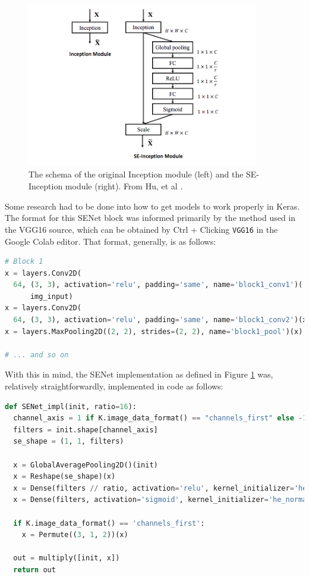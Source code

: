 \documentclass{article}
\begin{document}
\begin{figure}[H]
    \centering
    \includegraphics[width=4in]{csci-8110/hw-3/images/SENet_diagram.png}
    \caption{The schema of the original Inception module (left) and the SE-Inception module (right). From Hu, et al \cite{Hu2020Squeeze-and-ExcitationNetworks}.}
    \label{fig:diagram}
\end{figure}

\par Some research had to be done into how to get models to work properly in Keras. 
The format for this SENet block was informed primarily by the method used in the VGG16 source, which can be obtained by Ctrl + Clicking \lstinline{VGG16} in the Google Colab editor.
That format, generally, is as follows:

\begin{lstlisting}[language=Python]
# Block 1
x = layers.Conv2D(
  64, (3, 3), activation='relu', padding='same', name='block1_conv1')(
      img_input)
x = layers.Conv2D(
  64, (3, 3), activation='relu', padding='same', name='block1_conv2')(x)
x = layers.MaxPooling2D((2, 2), strides=(2, 2), name='block1_pool')(x)

# ... and so on
\end{lstlisting}

\par With this in mind, the SENet implementation as defined in Figure \ref{fig:diagram} was, relatively straightforwardly, implemented in code as follows:

\begin{lstlisting}[language=Python]
def SENet_impl(init, ratio=16):
  channel_axis = 1 if K.image_data_format() == "channels_first" else -1
  filters = init.shape[channel_axis]
  se_shape = (1, 1, filters)

  x = GlobalAveragePooling2D()(init)
  x = Reshape(se_shape)(x)
  x = Dense(filters // ratio, activation='relu', kernel_initializer='he_normal')(x)
  x = Dense(filters, activation='sigmoid', kernel_initializer='he_normal')(x)

  if K.image_data_format() == 'channels_first':
    x = Permute((3, 1, 2))(x)

  out = multiply([init, x])
  return out
\end{lstlisting}
\end{document}
